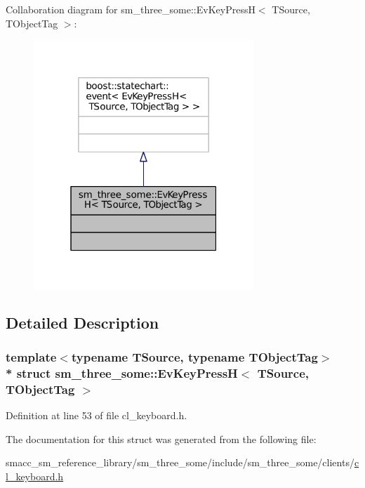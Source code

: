 Collaboration diagram for sm\+\_\+three\+\_\+some\+:\+:Ev\+Key\+PressH$<$ T\+Source, T\+Object\+Tag $>$\+:
\nopagebreak
\begin{figure}[H]
\begin{center}
\leavevmode
\includegraphics[width=235pt]{structsm__three__some_1_1EvKeyPressH__coll__graph}
\end{center}
\end{figure}


\subsection{Detailed Description}
\subsubsection*{template$<$typename T\+Source, typename T\+Object\+Tag$>$\\*
struct sm\+\_\+three\+\_\+some\+::\+Ev\+Key\+Press\+H$<$ T\+Source, T\+Object\+Tag $>$}



Definition at line 53 of file cl\+\_\+keyboard.\+h.



The documentation for this struct was generated from the following file\+:\begin{DoxyCompactItemize}
\item 
smacc\+\_\+sm\+\_\+reference\+\_\+library/sm\+\_\+three\+\_\+some/include/sm\+\_\+three\+\_\+some/clients/\hyperlink{cl__keyboard_8h}{cl\+\_\+keyboard.\+h}\end{DoxyCompactItemize}
